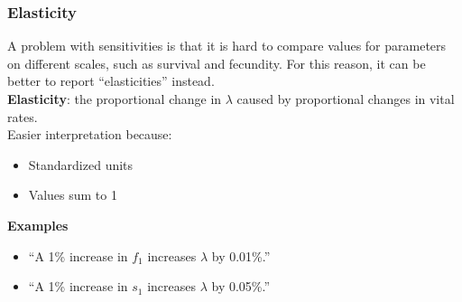 \documentclass[color=usenames,dvipsnames]{beamer}\usepackage[]{graphicx}\usepackage[]{xcolor}
\begin{document}
\begin{frame}
  \frametitle{Elasticity}
  A problem with sensitivities is that it is hard to compare values
  for parameters on different scales, such as survival and
  fecundity. For this reason, it can be better to report
  ``elasticities'' instead. \\
  \pause
  \vfill
  {\bf Elasticity}: the proportional change in $\lambda$ caused by
  proportional changes in vital rates. \\
  \pause
  \vfill
   Easier interpretation because: %
   \begin{itemize}
     \item Standardized units
     \item Values sum to 1
   \end{itemize}
   \pause
   \vfill
   {\bf Examples}
  \begin{itemize}
    \item[] ``A 1\% increase in $f_1$ increases $\lambda$ by 0.01\%.''
    \item[] ``A 1\% increase in $s_1$ increases $\lambda$ by 0.05\%.''
  \end{itemize}

\end{frame}
\end{document}
